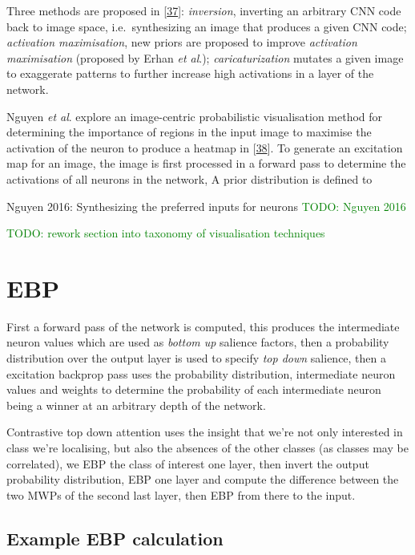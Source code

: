 \documentclass[A4paper,draft]{scrreprt}
\newcommand{\etal}{\textit{et al}.}
\begin{document}
Three methods are proposed in
{[}\protect\hyperlink{ref-mahendran2016_VisualizingDeepConvolutional}{37}{]}:
\emph{inversion}, inverting an arbitrary CNN code back to image space,
i.e.~synthesizing an image that produces a given CNN code;
\emph{activation maximisation}, new priors are proposed to improve
\emph{activation maximisation} (proposed by Erhan \etal{});
\emph{caricaturization} mutates a given image to exaggerate patterns to
further increase high activations in a layer of the network.

Nguyen \etal{} explore an image-centric probabilistic visualisation
method for determining the importance of regions in the input image to
maximise the activation of the neuron to produce a heatmap in
{[}\protect\hyperlink{ref-nguyen2016_Synthesizingpreferredinputs}{38}{]}.
To generate an excitation map for an image, the image is first processed
in a forward pass to determine the activations of all neurons in the
network, A prior distribution is defined to

Nguyen 2016: Synthesizing the preferred inputs for neurons
\textcolor{green}{TODO: Nguyen 2016}\newline

\textcolor{green}{TODO: rework section into taxonomy of visualisation techniques}\newline

\chapter{EBP}\label{ebp}

First a forward pass of the network is computed, this produces the
intermediate neuron values which are used as \emph{bottom up} salience
factors, then a probability distribution over the output layer is used
to specify \emph{top down} salience, then a excitation backprop pass
uses the probability distribution, intermediate neuron values and
weights to determine the probability of each intermediate neuron being a
winner at an arbitrary depth of the network.

Contrastive top down attention uses the insight that we're not only
interested in class we're localising, but also the absences of the other
classes (as classes may be correlated), we EBP the class of interest one
layer, then invert the output probability distribution, EBP one layer
and compute the difference between the two MWPs of the second last
layer, then EBP from there to the input.

\section{Example EBP calculation}\label{example-ebp-calculation}
\end{document}
